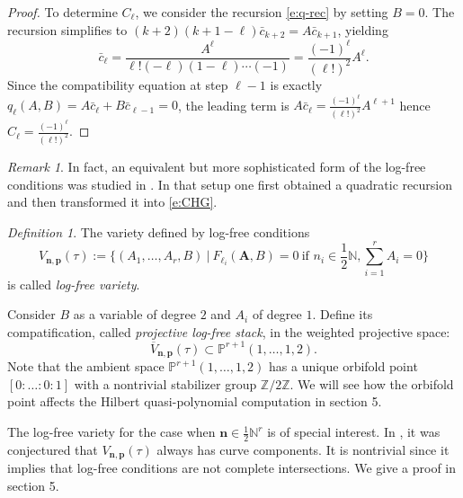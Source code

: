 \documentclass[11pt]{amsart}
\theoremstyle{remark}
\newtheorem{remark}[theorem]{Remark}
\newtheorem{definition}[theorem]{Definition}
\numberwithin{equation}{section}
\begin{document}
\begin{proof}
To determine $C_\ell$, we consider the recursion \eqref{e:q-rec} by setting $B = 0$. The recursion simplifies to $(k+2)(k+1-\ell)\bar c_{k+2} = A \bar c_{k+1}$, yielding 
\[ \bar c_\ell = \frac{A^\ell}{\ell! (-\ell)(1-\ell)\cdots (-1)} = \frac{(-1)^\ell}{(\ell!)^2} A^\ell. \]
Since the compatibility equation at step $\ell-1$ is exactly $q_\ell(A, B) = A \bar c_\ell + B \bar c_{\ell-1} = 0$, the leading term is $A \bar c_\ell = \frac{(-1)^\ell}{(\ell!)^2} A^{\ell+1}$ hence $C_\ell = \frac{(-1)^\ell}{(\ell!)^2}$.
\end{proof}

\begin{remark}
In fact, an equivalent but more sophisticated form of the log-free conditions was studied in \cite{Wang_2020}. In that setup one first obtained a quadratic recursion and then transformed it into \eqref{e:CHG}.  
\end{remark}

\begin{definition} The variety defined by log-free conditions
\[
V_{\mathbf{n},\mathbf{p}}(\tau) := \Big\{(A_1,\dots,A_r,B)\ | \ F_{\ell_i} (\mathbf{A}, B)=0 \ \mbox{if $n_i \in \frac12\mathbb{N}$}, \sum_{i=1}^r A_i=0 \Big\}
\]
is called \emph{log-free variety}.

Consider $B$ as a variable of degree $2$ and $A_i$ of degree $1$. Define its compatification, called \emph{projective log-free stack}, in the weighted projective space:
\[
    \overline{V}_{\mathbf{n},\mathbf{p}}(\tau) \subset \mathbb{P}^{r+1}(1,\dots,1,2). 
\]
Note that the ambient space $\mathbb{P}^{r+1}(1,\dots,1,2)$ has a unique orbifold point $[0:\dots:0:1]$ with a nontrivial stabilizer group $\mathbb{Z}/2\mathbb{Z}$. We will see how the orbifold point affects the Hilbert quasi-polynomial computation in section 5.
\end{definition}

The log-free variety for the case when $\mathbf{n} \in \frac{1}{2} \mathbb{N}^r$ is of special interest. 
In \cite[Conjecture 5.7]{Wang_2020}, it was conjectured that $V_{\mathbf{n},\mathbf{p}}(\tau)$ always has curve components. It is nontrivial since it implies that log-free conditions are not complete intersections. We give a proof in section 5.
\end{document}

